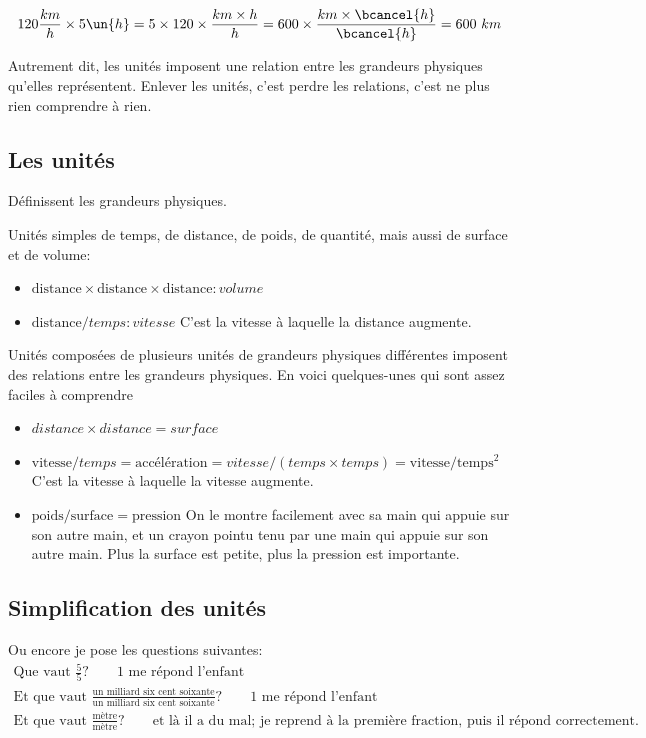 \begin{gather*}
    120 \frac{km}{h} \times 5\un{h}
    = 5\times120\times\frac{km\times h}{h}
    = 600\times\frac{km\times \bcancel{h}}{\bcancel{h}} 
    = 600 \mathrm\ {km}
\end{gather*}

Autrement dit, les unités imposent une relation entre les grandeurs physiques qu'elles représentent. Enlever les unités, c'est perdre les relations, c'est ne plus rien comprendre à rien.

\subsection{Les unités}
Définissent les grandeurs physiques.

Unités simples de temps, de distance, de poids, de quantité, mais aussi de surface et de volume:
\begin{itemize}
    \item $\text{distance} \times \text{distance} \times \text{distance}: volume$
    \item $\text{distance} / temps: vitesse$ C'est la vitesse à laquelle la distance augmente.
\end{itemize}


Unités composées de plusieurs unités de grandeurs physiques différentes imposent des relations entre les grandeurs physiques.
En voici quelques-unes qui sont assez faciles à comprendre

\begin{itemize}
\item $distance \times distance = surface$
    \item $\text{vitesse} / temps= \text{accélération} = vitesse / (temps \times temps) = \text{vitesse} /\text{temps}^2$ C'est la vitesse à laquelle la vitesse augmente.
    \item $\text{poids}/\text{surface}=\text{pression}$ On le montre facilement avec sa main qui appuie sur son autre main, et un crayon pointu tenu par une main qui appuie sur son autre main. Plus la surface est petite, plus la pression est importante.
\end{itemize}


\subsection{Simplification des unités}
Ou encore je pose les questions suivantes:
{\setlength{\jot}{10pt}
\begin{gather*}
    \text{Que vaut }\frac{5}{5} \text{?} \qquad \text{1 me répond l'enfant} \\
    \text{Et que vaut }\frac{\text{un milliard six cent soixante}}{\text{un milliard six cent soixante}} \text{?}  \qquad \text{1 me répond l'enfant} \\
    \text{Et que vaut }\frac{\text{mètre}}{\text{mètre}} \text{?} \qquad \text{et là il a du mal; je reprend à la première fraction, puis il répond correctement.}
\end{gather*}
}

